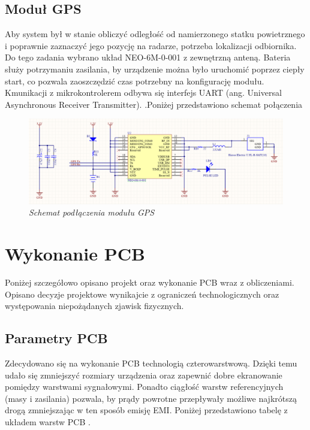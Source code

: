 \documentclass[eng,printmode]{mgr}
\begin{document}
\subsection*{Moduł GPS}
Aby system był w stanie obliczyć odległość od namierzonego statku powietrznego i poprawnie zaznaczyć jego pozycję na radarze, potrzeba lokalizacji odbiornika. Do tego zadania wybrano układ NEO-6M-0-001 z zewnętrzną anteną. Bateria służy potrzymaniu zasilania, by urządzenie można było uruchomić poprzez ciepły start, co pozwala zaoszczędzić czas potrzebny na konfigurację modułu. Kmunikacji z mikrokontrolerem odbywa się interfejs UART (ang. Universal Asynchronous Receiver Transmitter). .Poniżej przedstawiono schemat połączenia
\vskip 0.5cm
\begin{figure}[!h]
    \centering
    \includegraphics[width=\textwidth]{schematics/gps.png}
    \caption{\textit{Schemat podłączenia modułu GPS}}
    
\end{figure}
\newpage

\section{ Wykonanie PCB }
Poniżej szczegółowo opisano projekt oraz wykonanie PCB wraz z obliczeniami. Opisano decyzje projektowe wynikajcie z ograniczeń technologicznych oraz występowania niepożądanych zjawisk fizycznych.

\subsection*{Parametry PCB} \label{pcbSection}
Zdecydowano się na wykonanie PCB technologią czterowarstwową. Dzięki temu udało się zmniejszyć rozmiary urządzenia oraz zapewnić dobre ekranowanie pomiędzy warstwami sygnałowymi. Ponadto ciągłość warstw referencyjnych (masy i zasilania) pozwala, by prądy powrotne przepływały możliwe najkrótszą drogą zmniejszając w ten sposób emisję EMI. Poniżej przedstawiono tabelę z układem warstw PCB \cite{manufacturer}.
\end{document}
